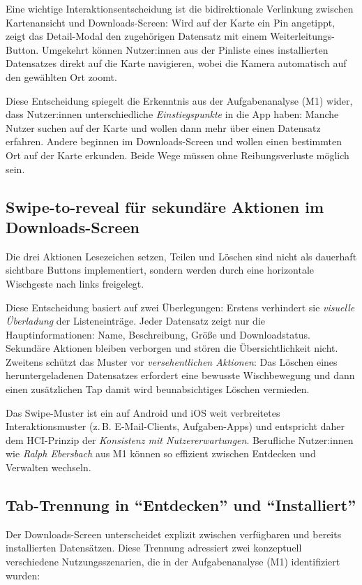 Eine wichtige Interaktionsentscheidung ist die bidirektionale Verlinkung zwischen Kartenansicht und Downloads-Screen:
Wird auf der Karte ein Pin angetippt, zeigt das Detail-Modal den zugehörigen Datensatz mit einem Weiterleitungs-Button.
Umgekehrt können Nutzer:innen aus der Pinliste eines installierten Datensatzes direkt auf die Karte navigieren,
wobei die Kamera automatisch auf den gewählten Ort zoomt.

Diese Entscheidung spiegelt die Erkenntnis aus der Aufgabenanalyse (M1) wider,
dass Nutzer:innen unterschiedliche \textit{Einstiegspunkte} in die App haben:
Manche Nutzer suchen auf der Karte und wollen dann mehr über einen Datensatz erfahren.
Andere beginnen im Downloads-Screen und wollen einen bestimmten Ort auf der Karte erkunden.
Beide Wege müssen ohne Reibungsverluste möglich sein.

\subsection{Swipe-to-reveal für sekundäre Aktionen im Downloads-Screen}

Die drei Aktionen Lesezeichen setzen, Teilen und Löschen sind nicht als dauerhaft sichtbare Buttons implementiert,
sondern werden durch eine horizontale Wischgeste nach links freigelegt.

Diese Entscheidung basiert auf zwei Überlegungen:
Erstens verhindert sie \textit{visuelle Überladung} der Listeneinträge.
Jeder Datensatz zeigt nur die Hauptinformationen: Name, Beschreibung, Größe und Downloadstatus.
Sekundäre Aktionen bleiben verborgen und stören die Übersichtlichkeit nicht.
Zweitens schützt das Muster vor \textit{versehentlichen Aktionen}:
Das Löschen eines heruntergeladenen Datensatzes erfordert eine bewusste Wischbewegung und dann einen zusätzlichen Tap damit wird beunabsichtiges Löschen vermieden.

Das Swipe-Muster ist ein auf Android und iOS weit verbreitetes Interaktionsmuster
(z.\,B. E-Mail-Clients, Aufgaben-Apps) und entspricht daher dem HCI-Prinzip der
\textit{Konsistenz mit Nutzererwartungen}.
Berufliche Nutzer:innen wie \textit{Ralph Ebersbach} aus M1 können so effizient zwischen Entdecken und Verwalten wechseln.

\subsection{Tab-Trennung in \enquote{Entdecken} und \enquote{Installiert}}

Der Downloads-Screen unterscheidet explizit zwischen verfügbaren und bereits installierten Datensätzen.
Diese Trennung adressiert zwei konzeptuell verschiedene Nutzungsszenarien, die in der Aufgabenanalyse (M1) identifiziert wurden:

